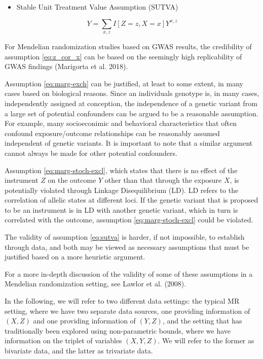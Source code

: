 \documentclass[
]{article}
\providecommand{\tightlist}{%
  \setlength{\itemsep}{0pt}\setlength{\parskip}{0pt}}
\theoremstyle{plain}
\begin{document}
\begin{itemize}
\tightlist
\item
  Stable Unit Treatment Value Assumption (SUTVA)
\end{itemize}

\begin{equation}
Y = \sum_{x,z} I[Z = z, X = x] Y^{x,z} \label{eq:sutva} \tag{A4}
\end{equation}

For Mendelian randomization studies based on GWAS results, the credibility of assumption \eqref{eq:z_cor_x} can be based on the seemingly high replicability of GWAS findings (Marigorta et al. 2018).

Assumption \eqref{eq:marg-exch} can be justified, at least to some extent, in many cases based on biological reasons. Since an individuals genotype is, in many cases, independently assigned at conception, the independence of a genetic variant from a large set of potential confounders can be argued to be a reasonable assumption. For example, many socioeconimic and behavioral characteristics that often confound exposure/outcome relationships can be reasonably assumed independent of genetic variants. It is important to note that a similar argument cannot always be made for other potential confounders.

Assumption \eqref{eq:marg-stoch-excl}, which states that there is no effect of the instrument \(Z\) on the outcome \(Y\) other than that through the exposure \(X\), is potentially violated through Linkage Disequilibrium (LD). LD refers to the correlation of allelic states at different loci. If the genetic variant that is proposed to be an instrument is in LD with another genetic variant, which in turn is correlated with the outcome, assumption \eqref{eq:marg-stoch-excl} could be violated.

The validity of assumption \eqref{eq:sutva} is harder, if not impossible, to establish through data, and both may be viewed as necessary assumptions that must be justified based on a more heuristic argument.

For a more in-depth discussion of the validity of some of these assumptions in a Mendelian randomization setting, see Lawlor et al. (2008).

In the following, we will refer to two different data settings: the typical MR setting, where we have two separate data sources, one providing information of \((X,Z)\) and one providing information of \((Y,Z)\), and the setting that has traditionally been explored using non-parametric bounds, where we have information on the triplet of variables \((X,Y,Z)\). We will refer to the former as bivariate data, and the latter as trivariate data.
\end{document}
